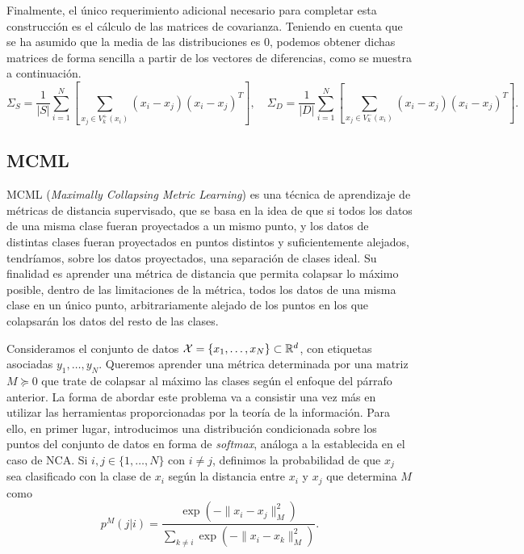 Finalmente, el único requerimiento adicional necesario para completar esta construcción es el cálculo de las matrices de covarianza. Teniendo en cuenta que se ha asumido que la media de las distribuciones es 0, podemos obtener dichas matrices de forma sencilla a partir de los vectores de diferencias, como se muestra a continuación.
\begin{equation*}
    \Sigma_S = \frac{1}{|S|}\sum_{i=1}^{N} \left[ \sum_{x_j \in V_k^+(x_i)} (x_i-x_j)(x_i-x_j)^T\right], \quad \Sigma_D = \frac{1}{|D|}\sum_{i=1}^{N} \left[ \sum_{x_j \in V_k^-(x_i)} (x_i-x_j)(x_i-x_j)^T\right].
\end{equation*}


\subsection{MCML}

MCML (\emph{Maximally Collapsing Metric Learning}) \cite{mcml} es una técnica de aprendizaje de métricas de distancia supervisado, que se basa en la idea de que si todos los datos de una misma clase fueran proyectados a un mismo punto, y los datos de distintas clases fueran proyectados en puntos distintos y suficientemente alejados, tendríamos, sobre los datos proyectados, una separación de clases ideal.  Su finalidad es aprender una métrica de distancia que permita colapsar lo máximo posible, dentro de las limitaciones de la métrica, todos los datos de una misma clase en un único punto, arbitrariamente alejado de los puntos en los que colapsarán los datos del resto de las clases.

Consideramos el conjunto de datos $\mathcal{X} = \{x_1,\dots,x_N\} \subset \mathbb{R}^d$, con etiquetas asociadas $y_1,\dots,y_N$. Queremos aprender una métrica determinada por una matriz $M \succeq 0$ que trate de colapsar al máximo las clases según el enfoque del párrafo anterior. La forma de abordar este problema va a consistir una vez más en utilizar las herramientas proporcionadas por la teoría de la información. Para ello, en primer lugar, introducimos una distribución condicionada sobre los puntos del conjunto de datos en forma de \emph{softmax}, análoga a la establecida en el caso de NCA. Si $i,j \in \{1,\dots,N\}$ con $i \ne j$, definimos la probabilidad de que $x_j$ sea clasificado con la clase de $x_i$ según la distancia entre $x_i$ y $x_j$ que determina $M$ como
\begin{equation}
    p^{M}(j|i) = \frac{\exp(-\|x_i-x_j\|^2_M)}{\sum\limits_{k\ne i} \exp(-\|x_i-x_k\|^2_M)}.
\end{equation}

